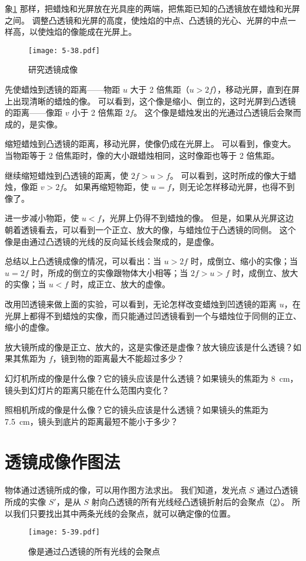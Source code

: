象\cref{fig:5-38} 那样，把蜡烛和光屏放在光具座的两端，把焦距已知的凸透镜放在蜡烛和光屏之间。
调整凸透镜和光屏的高度，使烛焰的中点、凸透镜的光心、光屏的中点一样高，以使烛焰的像能成在光屏上。
\begin{figure}
  \texttt{[image: 5-38.pdf]}
  \caption{研究透镜成像}\label{fig:5-38}
\end{figure}

先使蜡烛到透镜的距离——物距 $u$ 大于 2 倍焦距（$u>2f$），移动光屏，直到在屏上出现清晰的蜡烛的像。
可以看到，这个像是缩小、倒立的，这时光屏到凸透镜的距离——像距 $v$ 小于 2 倍焦距 $2f$。
这个像是蜡烛发出的光通过凸透镜后会聚而成的，是实像。

缩短蜡烛到凸透镜的距离，移动光屏，使像仍成在光屏上。
可以看到，像变大。当物距等于 2 倍焦距时，像的大小跟蜡烛相同，这时像距也等于 2 倍焦距。

继续缩短蜡烛到凸透镜的距离，使 $2f>u>f$。
可以看到，这时所成的像大于蜡烛，像距 $v>2f$。
如果再缩短物距，使 $u=f$，则无论怎样移动光屏，也得不到像了。

进一步减小物距，使 $u<f$，光屏上仍得不到蜡烛的像。
但是，如果从光屏这边朝着透镜看去，可以看到一个正立、放大的像，与蜡烛位于凸透镜的同侧。
这个像是由通过凸透镜的光线的反向延长线会聚成的，是虚像。

总结以上凸透镜成像的情况，可以看出：当 $u>2f$ 时，成倒立、缩小的实像；当 $u=2f$ 时，所成的倒立的实像跟物体大小相等；当 $2f>u>f$ 时，成倒立、放大的实像；当 $u<f$ 时，成正立、放大的虚像。

改用凹透镜来做上面的实验，可以看到，无论怎样改变蜡烛到凹透镜的距离 $u$，在光屏上都得不到蜡烛的实像，而只能通过凹透镜看到一个与蜡烛位于同侧的正立、缩小的虚像。

\begin{Practice}
\begin{question}
  \item 放大镜所成的像是正立、放大的，这是实像还是虚像？放大镜应该是什么透镜？如果其焦距为 $f$，镜到物的距离最大不能超过多少？
  \item 幻灯机所成的像是什么像？它的镜头应该是什么透镜？如果镜头的焦距为 \qty{8}{cm}，镜头到幻灯片的距离只能在什么范围内变化？
  \item 照相机所成的像是什么像？它的镜头应该是什么透镜？如果镜头的焦距为 \qty{7.5}{cm}，镜头到底片的距离最短不能小于多少？
\end{question}
\end{Practice}

\section{透镜成像作图法}
物体通过透镜所成的像，可以用作图方法求出。
我们知道，发光点 $S$ 通过凸透镜所成的实像 $S'$，是从 $S$ 射向凸透镜的所有光线经凸透镜折射后的会聚点（\cref{fig:5-39}）。
所以我们只要找出其中两条光线的会聚点，就可以确定像的位置。
\begin{figure}
  \texttt{[image: 5-39.pdf]}
  \caption{像是通过凸透镜的所有光线的会聚点}\label{fig:5-39}
\end{figure}

